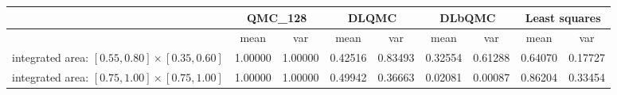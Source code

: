\begin{tabular}{|l|c|c|c|c|c|c|c|c|}
\hline
 &\multicolumn{2}{c|}{\textbf{QMC\_128}}&\multicolumn{2}{c|}{\textbf{DLQMC}}&\multicolumn{2}{c|}{\textbf{DLbQMC}}&\multicolumn{2}{c|}{\textbf{Least squares}}\\ 
\hline

 &mean&var&mean&var&mean&var&mean&var\\ 
\hline
integrated area: $[0.55,0.80]\times [0.35,0.60]$ &1.00000&1.00000&0.42516&0.83493&0.32554&0.61288&0.64070&0.17727\\ 
\hline
integrated area: $[0.75,1.00]\times [0.75,1.00]$ &1.00000&1.00000&0.49942&0.36663&0.02081&0.00087&0.86204&0.33454\\ 
\hline
\end{tabular}

